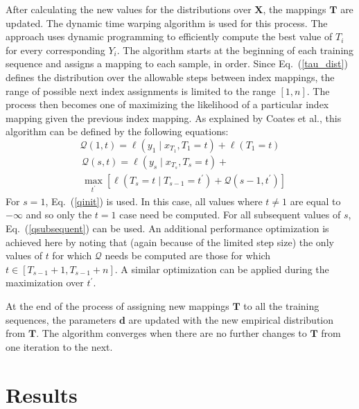 \documentclass{article}
\begin{document}
After calculating the new values for the distributions over $\mathbf{X}$, the mappings
$\mathbf{T}$ are updated. The dynamic time warping algorithm is used for this
process. The approach uses dynamic programming to efficiently compute the best
value of $T_i$ for every corresponding $Y_i$. The algorithm starts at the beginning
of each training sequence and assigns a mapping to each sample, in order. Since
Eq.\ (\ref{tau_dist}) defines the distribution over the allowable steps between
index mappings, the range of possible next index assignments is limited to the range
$\left[1,n\right]$. The process then becomes one of maximizing the likelihood of a
particular index mapping given the previous index mapping. As explained by Coates
et al., this algorithm can be defined by the following equations:
\begin{equation}
\label{qinit}
\mathcal{Q}\left(1,t\right)=\ell\left(y_1 \mid x_{T_1}, T_1=t\right)+\ell\left(T_1=t\right)
\end{equation}
\begin{equation}
\label{qsubsequent}
\begin{split}
&\mathcal{Q}\left(s,t\right) = \ell\left(y_s \mid x_{T_s}, T_s=t\right)+\\
&\max_{t^\prime}\left[\ell\left(T_s=t\mid T_{s-1}=t^\prime\right)+\mathcal{Q}\left(s-1,t^\prime\right)\right]
\end{split}
\end{equation}
For $s=1$, Eq.\ (\ref{qinit}) is used. In this case, all values where $t\neq1$ are
equal to $-\infty$ and so only the $t=1$ case need be computed. For all subsequent
values of $s$, Eq.\ (\ref{qsubsequent}) can be used. An additional performance
optimization is achieved here by noting that (again because of the limited step size)
the only values of $t$ for which $\mathcal{Q}$ needs be computed are those for which
$t\in\left[T_{s-1}+1,T_{s-1}+n\right]$. A similar optimization can be applied during the
maximization over $t^\prime$.

At the end of the process of assigning new mappings $\mathbf{T}$ to all the training
sequences, the parameters $\mathbf{d}$ are updated with the new empirical
distribution from $\mathbf{T}$. The algorithm converges when there are no further
changes to $\mathbf{T}$ from one iteration to the next.

\section{Results}
\end{document}
